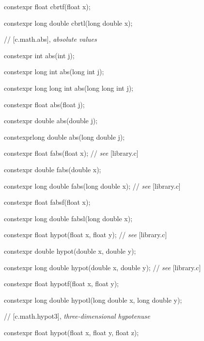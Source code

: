 \documentclass[prd,twocolumn,amsmath,amssymb,nofootinbib,eqsecnum]{revtex4-1}
\newcommand{\highlight}[1]{{\color{red} #1}}
\newcommand{\oldhighlight}[1]{{\color{green} #1}}
\newcommand{\stdcomment}[1]{{// {\em see} [#1]}}
\begin{document}
{\highlight{constexpr} float cbrtf(float x);

\highlight{constexpr} long double cbrtl(long double x);

\vspace{2ex}

//  [c.math.abs], {\em absolute values}


\oldhighlight{constexpr} int abs(int j);

\oldhighlight{constexpr} long int abs(long int j);

\oldhighlight{constexpr} long long int abs(long long int j);

\oldhighlight{constexpr} float abs(float j);

\oldhighlight{constexpr} double abs(double j);

\oldhighlight{constexpr}long double abs(long double j);

\vspace{2ex}


\oldhighlight{constexpr} float fabs(float x); \stdcomment{library.c}

\oldhighlight{constexpr} double fabs(double x);

\oldhighlight{constexpr} long double fabs(long double x); \stdcomment{library.c}

\oldhighlight{constexpr} float fabsf(float x);

\oldhighlight{constexpr} long double fabsl(long double x);

\vspace{2ex}


\highlight{constexpr} float hypot(float x, float y); \stdcomment{library.c}

\highlight{constexpr} double hypot(double x, double y);

\highlight{constexpr} long double hypot(double x, double y); \stdcomment{library.c}

\highlight{constexpr} float hypotf(float x, float y);

\highlight{constexpr} long double hypotl(long double x, long double y);

\vspace{2ex}

// [c.math.hypot3], {\em three-dimensional hypotenuse}


\highlight{constexpr} float hypot(float x, float y, float z);

}
\end{document}
